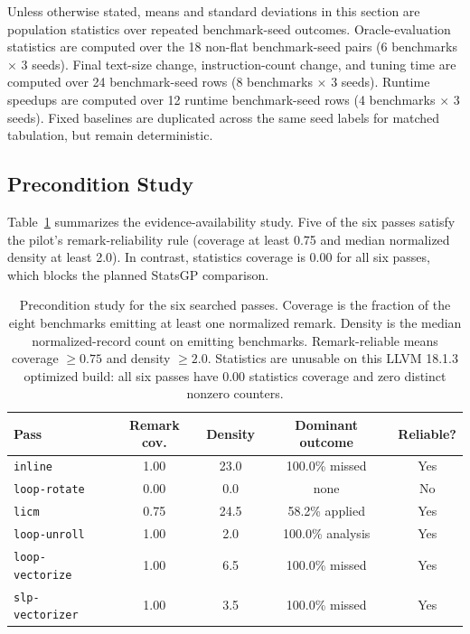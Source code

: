 \documentclass{article}
\begin{document}
Unless otherwise stated, means and standard deviations in this section are population statistics over repeated benchmark-seed outcomes. Oracle-evaluation statistics are computed over the 18 non-flat benchmark-seed pairs (6 benchmarks $\times$ 3 seeds). Final text-size change, instruction-count change, and tuning time are computed over 24 benchmark-seed rows (8 benchmarks $\times$ 3 seeds). Runtime speedups are computed over 12 runtime benchmark-seed rows (4 benchmarks $\times$ 3 seeds). Fixed baselines are duplicated across the same seed labels for matched tabulation, but remain deterministic.

\subsection{Precondition Study}

Table~\ref{tab:precondition} summarizes the evidence-availability study. Five of the six passes satisfy the pilot's remark-reliability rule (coverage at least 0.75 and median normalized density at least 2.0). In contrast, statistics coverage is 0.00 for all six passes, which blocks the planned StatsGP comparison.

\begin{table}[t]
\caption{Precondition study for the six searched passes. Coverage is the fraction of the eight benchmarks emitting at least one normalized remark. Density is the median normalized-record count on emitting benchmarks. Remark-reliable means coverage $\ge 0.75$ and density $\ge 2.0$. Statistics are unusable on this LLVM 18.1.3 optimized build: all six passes have 0.00 statistics coverage and zero distinct nonzero counters.}
\label{tab:precondition}
\centering
\small
\begin{tabular}{lcccc}
\toprule
Pass & Remark cov. & Density & Dominant outcome & Reliable? \\
\midrule
\texttt{inline} & 1.00 & 23.0 & 100.0\% missed & Yes \\
\texttt{loop-rotate} & 0.00 & 0.0 & none & No \\
\texttt{licm} & 0.75 & 24.5 & 58.2\% applied & Yes \\
\texttt{loop-unroll} & 1.00 & 2.0 & 100.0\% analysis & Yes \\
\texttt{loop-vectorize} & 1.00 & 6.5 & 100.0\% missed & Yes \\
\texttt{slp-vectorizer} & 1.00 & 3.5 & 100.0\% missed & Yes \\
\bottomrule
\end{tabular}
\end{table}
\end{document}
